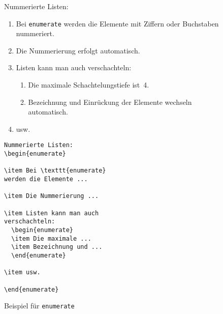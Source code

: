 \begin{figure}[!htbp]
\begin{lminipage}{\textwidth}
\exa
Nummerierte Listen:
\begin{enumerate}
\relax %
\item Bei \texttt{enumerate} werden
die Elemente mit Ziffern oder Buchstaben nummeriert.
\item Die Nummerierung erfolgt
automatisch.
\item Listen kann man auch
verschachteln:
  \begin{enumerate}
  \item Die maximale Schachtelungstiefe
  ist~4.
  \item Bezeichnung und Einrückung der Elemente
  wechseln automatisch.
  \end{enumerate}
\item usw.
\end{enumerate}
\exb
\begin{verbatim}
Nummerierte Listen:
\begin{enumerate}
 
\item Bei \texttt{enumerate}
werden die Elemente ...
 
\item Die Nummerierung ...
 
\item Listen kann man auch
verschachteln:
  \begin{enumerate}
  \item Die maximale ...
  \item Bezeichnung und ...
  \end{enumerate}
 
\item usw.
 
\end{enumerate}
\end{verbatim}
\exc
\end{lminipage}
\caption{Beispiel für \texttt{enumerate}} \label{enum}
\end{figure}
 
